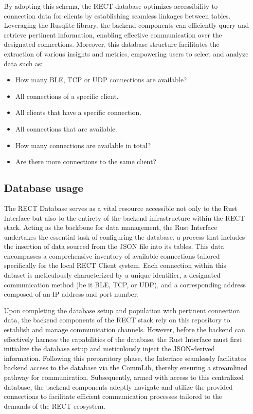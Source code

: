 By adopting this schema, the RECT database optimizes accessibility to connection data for clients by establishing seamless linkages between tables. Leveraging the Rusqlite
library, the backend components can efficiently query and retrieve pertinent information, enabling effective communication over the designated connections. Moreover, this 
database structure facilitates the extraction of various insights and metrics, empowering users to select and analyze data such as:

\begin{itemize}
  \item[] How many BLE, TCP or UDP connections are available?
  \item[] All connections of a specific client.
  \item[] All clients that have a specific connection.
  \item[] All connections that are available.
  \item[] How many connections are available in total?
  \item[] Are there more connections to the same client?
\end{itemize}

\subsection{Database usage}

The RECT Database serves as a vital resource accessible not only to the Rust Interface but also to the entirety of the backend infrastructure within the RECT stack. 
Acting as the backbone for data management, the Rust Interface undertakes the essential task of configuring the database, a process that includes the insertion of data 
sourced from the JSON file into its tables. This data encompasses a comprehensive inventory of available connections tailored specifically for the local RECT Client system.
Each connection within this dataset is meticulously characterized by a unique identifier, a designated communication method (be it BLE, TCP, or UDP), and a corresponding 
address composed of an IP address and port number.\newline

Upon completing the database setup and population with pertinent connection data, the backend components of the RECT stack rely on this repository to establish and manage 
communication channels. However, before the backend can effectively harness the capabilities of the database, the Rust Interface must first initialize the database setup 
and meticulously inject the JSON-derived information. Following this preparatory phase, the Interface seamlessly facilitates backend access to the database via the CommLib,
thereby ensuring a streamlined pathway for communication. Subsequently, armed with access to this centralized database, the backend components adeptly navigate and utilize
the provided connections to facilitate efficient communication processes tailored to the demands of the RECT ecosystem.

